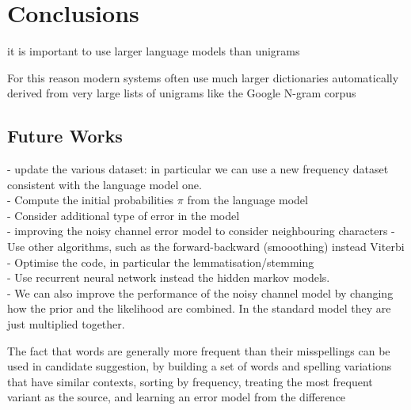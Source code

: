 \chapter{Conclusions}

it is important to use larger language models than unigrams


For this reason modern systems often use much larger dictionaries automatically derived from very large lists of 
unigrams like the Google N-gram corpus

\section{Future Works}

- update the various dataset: in particular we can use a new frequency dataset consistent with the language model one.\\
- Compute the initial probabilities $\pi$ from the language model\\
- Consider additional type of error in the model\\
- improving the noisy channel error model to consider neighbouring characters
- Use other algorithms, such as the forward-backward (smooothing) instead Viterbi\\
- Optimise the code, in particular the lemmatisation/stemming \\
- Use recurrent neural network instead the hidden markov models.\\
- We can also improve the performance of the noisy channel model by changing how the prior and the likelihood 
are combined. In the standard model they are just multiplied together.

The fact that words are generally more frequent than their misspellings can be used in candidate suggestion, by 
building a set of words and spelling variations that have similar contexts, sorting by frequency, treating the most 
frequent variant as the source, and learning an error model from the difference